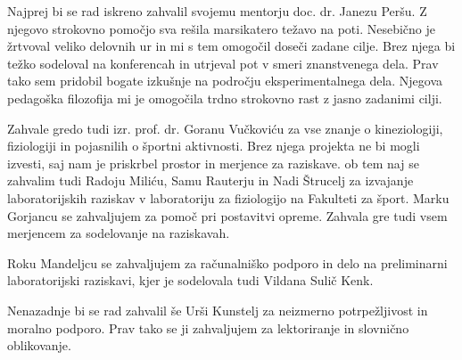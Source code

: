 \zahvala 
Najprej bi se rad iskreno zahvalil svojemu mentorju doc. dr. Janezu Peršu. Z njegovo strokovno pomočjo sva rešila marsikatero težavo na poti. Nesebično je žrtvoval veliko delovnih ur in mi s tem omogočil doseči zadane cilje. Brez njega bi težko sodeloval na konferencah in utrjeval pot v smeri znanstvenega dela. Prav tako sem pridobil bogate izkušnje na področju eksperimentalnega dela. Njegova pedagoška filozofija mi je omogočila trdno strokovno rast z jasno zadanimi cilji.

Zahvale gredo tudi izr. prof. dr. Goranu Vučkoviću za vse znanje o kineziologiji, fiziologiji in pojasnilih o športni aktivnosti. Brez njega projekta ne bi mogli izvesti, saj nam je priskrbel prostor in merjence za raziskave. ob tem naj se zahvalim tudi Radoju Miliću, Samu Rauterju in Nadi Štrucelj za izvajanje laboratorijskih raziskav v laboratoriju za fiziologijo na Fakulteti za šport. Marku Gorjancu se zahvaljujem za pomoč pri postavitvi opreme. Zahvala gre tudi vsem merjencem za sodelovanje na raziskavah. 

Roku Mandeljcu se zahvaljujem za računalniško podporo in delo na preliminarni laboratorijski raziskavi, kjer je sodelovala tudi Vildana Sulič Kenk.

Nenazadnje bi se rad zahvalil še Urši Kunstelj za neizmerno potrpežljivost in moralno podporo. Prav tako se ji zahvaljujem za lektoriranje in slovnično oblikovanje.